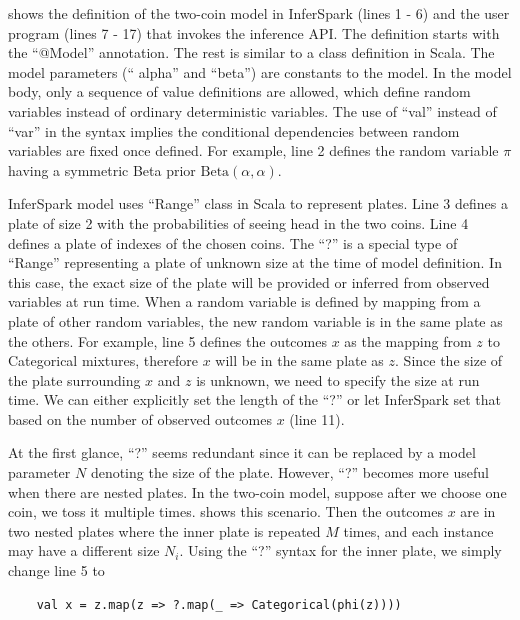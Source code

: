  shows the definition of the two-coin model in
InferSpark (lines 1 - 6) and the user program (lines 7 - 17) that invokes the
inference API. The definition starts with the ``{\sf @Model}'' annotation.  The
rest is similar to a class definition in Scala. The model parameters (``{\sf
alpha}'' and ``{\sf beta}'') are constants to the model. In the model body,
only a sequence of value definitions are allowed, which define random
variables instead of ordinary deterministic variables.  The use of ``{\sf val}''
instead of ``{\sf var}'' in the syntax implies the conditional dependencies
between random variables are fixed once defined. For example, line 2 defines
the random variable $\pi$ having a symmetric Beta prior $\mathrm{Beta}(\alpha,
\alpha)$.

InferSpark model uses ``Range'' class in Scala to represent plates. Line 3
defines a plate of size 2 with the probabilities of seeing head in the two
coins. Line 4 defines a plate of indexes of the chosen coins. The ``?'' is a
special type of ``Range'' representing a plate of unknown size at the time of
model definition.  In this case, the exact size of the plate will be provided
or inferred from observed variables at run time.  When a random variable is
defined by mapping from a plate of other random variables, the new random
variable is in the same plate as the others.  For example, line 5 defines the
outcomes $x$ as the mapping from $z$ to Categorical mixtures, therefore $x$
will be in the same plate as $z$. Since the size of the plate surrounding $x$
and $z$ is unknown, we need to specify the size at run time.  We can either
explicitly set the length of the ``?'' or let InferSpark set that based on the
number of observed outcomes $x$ (line 11).

At the first glance, ``?'' seems redundant since it can be replaced by a
model parameter $N$ denoting the size of the plate.  However, ``?'' becomes
more useful when there are nested plates. In the two-coin model, suppose
after we choose one coin, we toss it multiple times. 
 shows this scenario.
Then the outcomes $x$ are in two nested plates where the inner plate is
repeated $M$ times, and each instance may have
a different size $N_i$. Using the ``?'' syntax
for the inner plate, we simply change line 5 to
\begin{center}
\begin{verbatim}
	val x = z.map(z => ?.map(_ => Categorical(phi(z))))	
\end{verbatim}
\end{center}

